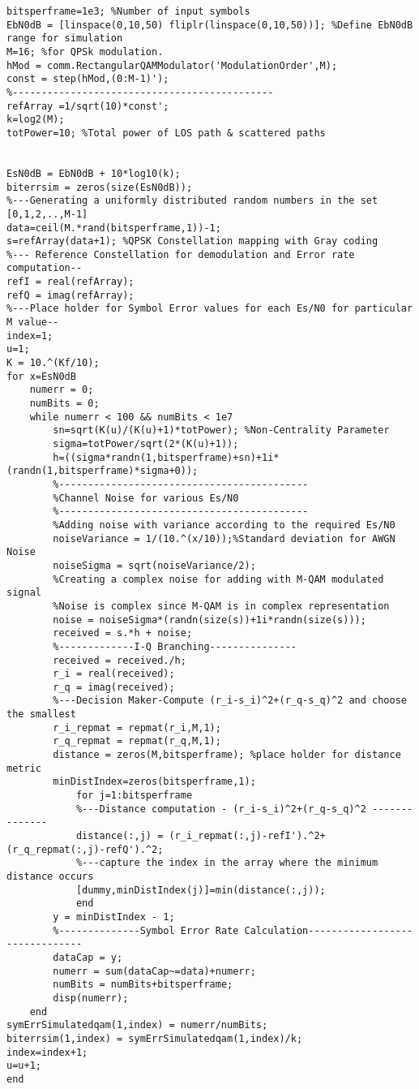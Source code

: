 \begin{lstlisting}[breaklines]
%% 16 QAM
bitsperframe=1e3; %Number of input symbols
EbN0dB = [linspace(0,10,50) fliplr(linspace(0,10,50))]; %Define EbN0dB range for simulation
M=16; %for QPSk modulation.
hMod = comm.RectangularQAMModulator('ModulationOrder',M);
const = step(hMod,(0:M-1)');
%---------------------------------------------
refArray =1/sqrt(10)*const';
k=log2(M);
totPower=10; %Total power of LOS path & scattered paths


EsN0dB = EbN0dB + 10*log10(k);
biterrsim = zeros(size(EsN0dB));
%---Generating a uniformly distributed random numbers in the set [0,1,2,..,M-1]
data=ceil(M.*rand(bitsperframe,1))-1;
s=refArray(data+1); %QPSK Constellation mapping with Gray coding
%--- Reference Constellation for demodulation and Error rate computation--
refI = real(refArray);
refQ = imag(refArray);
%---Place holder for Symbol Error values for each Es/N0 for particular M value--
index=1;
u=1;
K = 10.^(Kf/10);
for x=EsN0dB
    numerr = 0;
    numBits = 0;
    while numerr < 100 && numBits < 1e7
        sn=sqrt(K(u)/(K(u)+1)*totPower); %Non-Centrality Parameter
        sigma=totPower/sqrt(2*(K(u)+1));
        h=((sigma*randn(1,bitsperframe)+sn)+1i*(randn(1,bitsperframe)*sigma+0));
        %-------------------------------------------
        %Channel Noise for various Es/N0
        %-------------------------------------------
        %Adding noise with variance according to the required Es/N0
        noiseVariance = 1/(10.^(x/10));%Standard deviation for AWGN Noise
        noiseSigma = sqrt(noiseVariance/2);
        %Creating a complex noise for adding with M-QAM modulated signal
        %Noise is complex since M-QAM is in complex representation
        noise = noiseSigma*(randn(size(s))+1i*randn(size(s)));
        received = s.*h + noise;
        %-------------I-Q Branching---------------
        received = received./h;
        r_i = real(received);
        r_q = imag(received);
        %---Decision Maker-Compute (r_i-s_i)^2+(r_q-s_q)^2 and choose the smallest
        r_i_repmat = repmat(r_i,M,1);
        r_q_repmat = repmat(r_q,M,1);
        distance = zeros(M,bitsperframe); %place holder for distance metric
        minDistIndex=zeros(bitsperframe,1);
            for j=1:bitsperframe
            %---Distance computation - (r_i-s_i)^2+(r_q-s_q)^2 --------------
            distance(:,j) = (r_i_repmat(:,j)-refI').^2+(r_q_repmat(:,j)-refQ').^2;
            %---capture the index in the array where the minimum distance occurs
            [dummy,minDistIndex(j)]=min(distance(:,j));
            end
        y = minDistIndex - 1;
        %--------------Symbol Error Rate Calculation-------------------------------
        dataCap = y;
        numerr = sum(dataCap~=data)+numerr;
        numBits = numBits+bitsperframe;
        disp(numerr);
    end
symErrSimulatedqam(1,index) = numerr/numBits;
biterrsim(1,index) = symErrSimulatedqam(1,index)/k;
index=index+1;
u=u+1;
end


\end{lstlisting}
